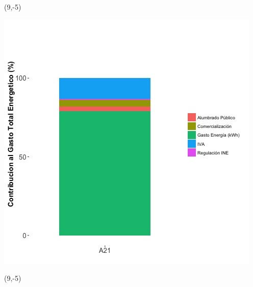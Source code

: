 \documentclass{article}\usepackage[]{graphicx}\usepackage[]{color}
\newenvironment{knitrout}{}{} %
\begin{document}
 \begin{textblock}{1}(9,-5)
\begin{minipage}{20em}
\begingroup

\endgroup
\end{minipage}
\end{textblock}

\begin{knitrout}
\color{fgcolor}
\includegraphics[scale=0.65]{figure/A21_costvars_plot.jpg} 
\end{knitrout}

 \begin{textblock}{1}(9,-5)
\begin{minipage}{20em}
\begingroup

\endgroup
\end{minipage}
\end{textblock}
\end{document}
